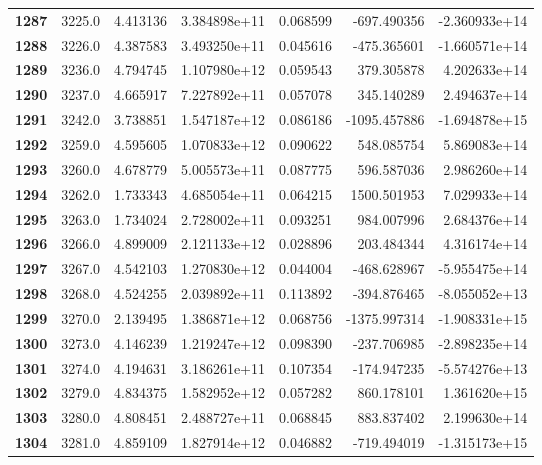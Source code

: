 \documentclass{report}[12pt]
\begin{document}
\begin{center}
\begin{tabular}{lrrrrrr}
\textbf{1287} &         3225.0 &   4.413136 &  3.384898e+11 &    0.068599 &  -697.490356 & -2.360933e+14 \\
\textbf{1288} &         3226.0 &   4.387583 &  3.493250e+11 &    0.045616 &  -475.365601 & -1.660571e+14 \\
\textbf{1289} &         3236.0 &   4.794745 &  1.107980e+12 &    0.059543 &   379.305878 &  4.202633e+14 \\
\textbf{1290} &         3237.0 &   4.665917 &  7.227892e+11 &    0.057078 &   345.140289 &  2.494637e+14 \\
\textbf{1291} &         3242.0 &   3.738851 &  1.547187e+12 &    0.086186 & -1095.457886 & -1.694878e+15 \\
\textbf{1292} &         3259.0 &   4.595605 &  1.070833e+12 &    0.090622 &   548.085754 &  5.869083e+14 \\
\textbf{1293} &         3260.0 &   4.678779 &  5.005573e+11 &    0.087775 &   596.587036 &  2.986260e+14 \\
\textbf{1294} &         3262.0 &   1.733343 &  4.685054e+11 &    0.064215 &  1500.501953 &  7.029933e+14 \\
\textbf{1295} &         3263.0 &   1.734024 &  2.728002e+11 &    0.093251 &   984.007996 &  2.684376e+14 \\
\textbf{1296} &         3266.0 &   4.899009 &  2.121133e+12 &    0.028896 &   203.484344 &  4.316174e+14 \\
\textbf{1297} &         3267.0 &   4.542103 &  1.270830e+12 &    0.044004 &  -468.628967 & -5.955475e+14 \\
\textbf{1298} &         3268.0 &   4.524255 &  2.039892e+11 &    0.113892 &  -394.876465 & -8.055052e+13 \\
\textbf{1299} &         3270.0 &   2.139495 &  1.386871e+12 &    0.068756 & -1375.997314 & -1.908331e+15 \\
\textbf{1300} &         3273.0 &   4.146239 &  1.219247e+12 &    0.098390 &  -237.706985 & -2.898235e+14 \\
\textbf{1301} &         3274.0 &   4.194631 &  3.186261e+11 &    0.107354 &  -174.947235 & -5.574276e+13 \\
\textbf{1302} &         3279.0 &   4.834375 &  1.582952e+12 &    0.057282 &   860.178101 &  1.361620e+15 \\
\textbf{1303} &         3280.0 &   4.808451 &  2.488727e+11 &    0.068845 &   883.837402 &  2.199630e+14 \\
\textbf{1304} &         3281.0 &   4.859109 &  1.827914e+12 &    0.046882 &  -719.494019 & -1.315173e+15 \\

\end{tabular}
\end{center}
\end{document}
